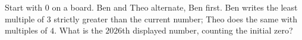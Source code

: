 Start with $0$ on a board. Ben and Theo alternate, Ben first. Ben writes the least multiple of $3$ strictly greater than the current number; Theo does the same with multiples of $4$. What is the $2026$th displayed number, counting the initial zero?
